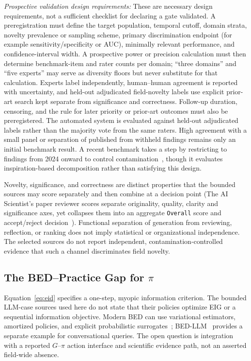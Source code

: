 \documentclass{article}
\begin{document}
\textit{Prospective validation design requirements:} These are necessary design requirements, not a sufficient checklist for declaring a gate validated. A preregistration must define the target population, temporal cutoff, domain strata, novelty prevalence or sampling scheme, primary discrimination endpoint (for example sensitivity/specificity or AUC), minimally relevant performance, and confidence-interval width. A prospective power or precision calculation must then determine benchmark-item and rater counts per domain; ``three domains'' and ``five experts'' may serve as diversity floors but never substitute for that calculation. Experts label independently, human--human agreement is reported with uncertainty, and held-out adjudicated field-novelty labels use explicit prior-art search kept separate from significance and correctness. Follow-up duration, censoring, and the rule for later priority or prior-art outcomes must also be preregistered. The automated system is evaluated against held-out adjudicated labels rather than the majority vote from the same raters. High agreement with a small panel or separation of published from withheld findings remains only an initial benchmark result. A recent benchmark takes a step by restricting to findings from 2024 onward to control contamination~\citep{liu2025researchbench}, though it evaluates inspiration-based decomposition rather than satisfying this design.

Novelty, significance, and correctness are distinct properties that the bounded sources may score separately and then combine at a decision point (The AI Scientist's paper reviewer scores separate originality, quality, clarity and significance axes, yet collapses them into an aggregate \texttt{Overall} score and accept/reject decision~\citep{lu2024aiscientist}). Functional separation of generation from reviewing, reflection, or ranking does not imply statistical or organizational independence. The selected sources do not report independent, contamination-controlled evidence that such a channel discriminates field novelty.

\subsection{The BED--Practice Gap for $\pi$}

Equation~\ref{eq:eid} specifies a one-step, myopic information criterion. The bounded LLM-case sources used here do not state that their policies optimize EIG or a sequential information objective. Modern BED can use variational estimators, amortized policies, and explicit probabilistic surrogates~\citep{foster2019variational,foster2021dad}; BED-LLM~\citep{choudhury2026bedllm} provides a separate example for conversational queries. The open question is integration with a reported $G$--$\pi$ action interface and scientific evidence path, not an asserted field-wide absence.
\end{document}
